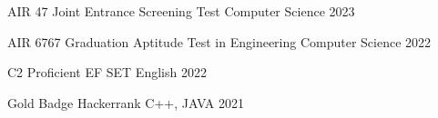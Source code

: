 
\begin{cvhonors}

  \cvhonor
    {AIR 47} %
    {Joint Entrance Screening Test} %
    {Computer Science} %
    {2023} %

  \cvhonor
    {AIR 6767} %
    {Graduation Aptitude Test in Engineering} %
    {Computer Science} %
    {2022} %

  \cvhonor
    {C2 Proficient} %
    {EF SET} %
    {English} %
    {2022} %

  \cvhonor
    {Gold Badge} %
    {Hackerrank} %
    {C++, JAVA} %
    {2021} %

\end{cvhonors}


